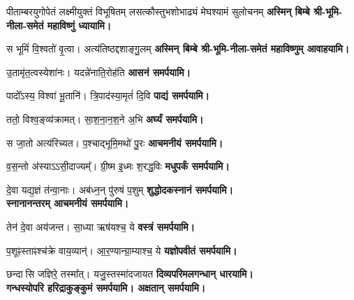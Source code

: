 \begin{center}
\renewcommand{\ShlokaStrut}{\vphantom{र्क॑हु॒}}
\label{sec:start_ekadashi_puja}
{पीताम्बरयुगोपेतं लक्ष्मीयुक्तं विभूषितम्}
{लसत्कौस्तुभशोभाढ्यं मेघश्यामं सुलोचनम्}
\textbf{अस्मिन् बिम्बे श्री-भूमि-नीला-समेतं महाविष्णुं ध्यायामि।}
\medskip

{स भूमिं॑ वि॒श्वतो॑ वृ॒त्वा। अत्य॑तिष्ठद्दशाङ्गु॒लम्}
\textbf{अस्मिन् बिम्बे श्री-भूमि-नीला-समेतं महाविष्णुम् आवाहयामि।}
\medskip

{उ॒तामृ॑त॒त्वस्येशा॑नः। यदन्ने॑नाति॒रोह॑ति}
\textbf{\devAya{} आसनं समर्पयामि।}
\medskip

{पादो᳚ऽस्य॒ विश्वा॑ भू॒तानि॑। त्रि॒पाद॑स्या॒मृतं॑ दि॒वि}
\textbf{\devAya{} पाद्यं समर्पयामि।}
\medskip

{ततो॒ विश्व॒ङ्व्य॑क्रामत्। सा॒श॒ना॒न॒श॒ने अ॒भि}
\textbf{\devAya{} अर्घ्यं समर्पयामि।}
\medskip

{स जा॒तो अत्य॑रिच्यत। प॒श्चाद्भूमि॒मथो॑ पु॒रः}
\textbf{\devAya{} आचमनीयं समर्पयामि।}
\medskip

{व॒स॒न्तो अ॑स्याऽऽसी॒दाज्यम्᳚। ग्री॒ष्म इ॒ध्मः श॒रद्ध॒विः}
\textbf{\devAya{} मधुपर्कं समर्पयामि।}
\medskip

{दे॒वा यद्य॒ज्ञं त॑न्वा॒नाः। अब॑ध्न॒न् पु॑रुषं प॒शुम्}
\textbf{\devAya{} शुद्धोदकस्नानं समर्पयामि।\\
स्नानानन्तरम् आचमनीयं समर्पयामि।}
\medskip

{तेन॑ दे॒वा अय॑जन्त। सा॒ध्या ऋष॑यश्च॒ ये}
\textbf{\devAya{} वस्त्रं समर्पयामि।}
\medskip

{प॒शूꣴस्ताꣴश्च॑क्रे वाय॒व्यान्॑। आ॒र॒ण्यान्ग्रा॒म्याश्च॒ ये}
\textbf{\devAya{} यज्ञोपवीतं समर्पयामि।}
\medskip

{छन्दासि जज्ञिरे॒ तस्मा᳚त्। यजु॒स्तस्मा॑दजायत}
\textbf{\devAya{} दिव्यपरिमलगन्धान् धारयामि।\\
गन्धस्योपरि हरिद्राकुङ्कुमं समर्पयामि। अक्षतान् समर्पयामि।}
\medskip


\end{center}
